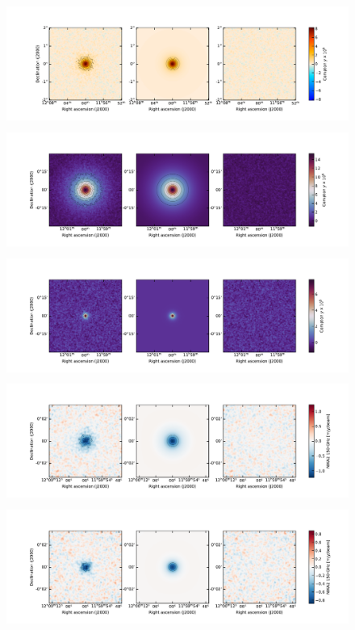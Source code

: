 \begin{figure}[tp]
    \centering
    \includegraphics[height=4cm, trim={2cm 0.7cm 1.5cm 1.5cm}, clip]{../validation/results/C1/Planck/data_model_residuals_maps.pdf}
    \includegraphics[height=4cm, trim={2cm 0.7cm 1.5cm 1.5cm}, clip]{../validation/results/C1/SPT/data_model_residuals_maps.pdf}
    \includegraphics[height=4cm, trim={2cm 0.7cm 1.5cm 1.5cm}, clip]{../validation/results/C2/SPT/data_model_residuals_maps.pdf}
    \includegraphics[height=4cm, trim={2cm 0.7cm 1.5cm 1.5cm}, clip]{../validation/results/C2/NIKA2/data_model_residuals_maps.pdf}
    \includegraphics[height=4cm, trim={2cm 0.7cm 1.5cm 1.5cm}, clip]{../validation/results/C3/NIKA2/data_model_residuals_maps.pdf}

\end{figure}
